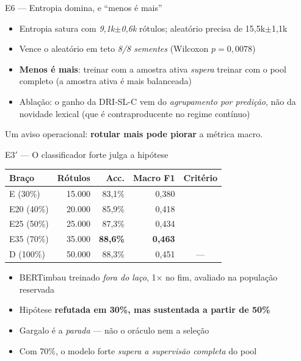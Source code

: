 \documentclass[aspectratio=169,11pt]{beamer}
\newcommand{\cmark}{\textcolor{green!55!black}{\ding{51}}}
\newcommand{\xmark}{\textcolor{red!70!black}{\ding{55}}}
\begin{document}
\begin{frame}{E6 --- Entropia domina, e ``menos é mais''}
\begin{itemize}\footnotesize
  \item Entropia satura com \emph{9,1k$\pm$0,6k} rótulos; aleatório precisa de 15,5k$\pm$1,1k
  \item Vence o aleatório em teto \emph{8/8 sementes} (Wilcoxon $p=0{,}0078$)
  \item \textbf{Menos é mais}: treinar com a amostra ativa \emph{supera} treinar
        com o pool completo (a amostra ativa é mais balanceada)
  \item Ablação: o ganho da DRI-SL-C vem do \emph{agrupamento por predição},
        não da novidade lexical (que é contraproducente no regime contínuo)
\end{itemize}
\vspace{0.4em}
\centering\footnotesize
Um aviso operacional: \textbf{rotular mais pode piorar} a métrica macro.
\end{frame}


\begin{frame}{E3$'$ --- O classificador forte julga a hipótese}
\centering\small
\begin{tabular}{lrrrc}
\toprule
\textbf{Braço} & \textbf{Rótulos} & \textbf{Acc.} & \textbf{Macro F1} & \textbf{Critério} \\
\midrule
E (30\%)  & 15.000 & 83,1\% & 0,380 & \xmark~\xmark \\
E20 (40\%) & 20.000 & 85,9\% & 0,418 & \cmark~\xmark \\
E25 (50\%) & 25.000 & 87,3\% & 0,434 & \cmark~\cmark \\
E35 (70\%) & 35.000 & \textbf{88,6\%} & \textbf{0,463} & \cmark~\cmark \\
D (100\%)  & 50.000 & 88,3\% & 0,451 & --- \\
\bottomrule
\end{tabular}
\vspace{0.5em}
\begin{itemize}\footnotesize
  \item BERTimbau treinado \emph{fora do laço}, 1× no fim, avaliado na população reservada
  \item Hipótese \textbf{refutada em 30\%, mas sustentada a partir de 50\%}
  \item Gargalo é a \emph{parada} --- não o oráculo nem a seleção
  \item Com 70\%, o modelo forte \emph{supera a supervisão completa} do pool
\end{itemize}
\end{frame}
\end{document}
